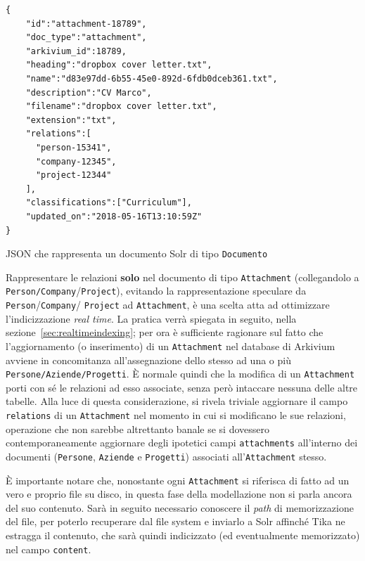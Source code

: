\vspace{0.5em}
\begin{listing}[H]
\begin{verbatim}
{
    "id":"attachment-18789",
    "doc_type":"attachment",
    "arkivium_id":18789,
    "heading":"dropbox cover letter.txt",
    "name":"d83e97dd-6b55-45e0-892d-6fdb0dceb361.txt",
    "description":"CV Marco",
    "filename":"dropbox cover letter.txt",
    "extension":"txt",
    "relations":[
      "person-15341",
      "company-12345",
      "project-12344"
    ],
    "classifications":["Curriculum"],
    "updated_on":"2018-05-16T13:10:59Z"
}
\end{verbatim}
\caption{JSON che rappresenta un documento Solr di tipo \texttt{Documento}}
\label{code:documentjson}
\end{listing}

\vspace{-0.5em}
Rappresentare le relazioni \textbf{solo} nel documento di tipo \texttt{Attachment} (collegandolo a \texttt{Person/Company}/\texttt{Project}), evitando la rappresentazione speculare da \texttt{Person}/\texttt{Company}/ \texttt{Project} ad \texttt{Attachment}, è una scelta atta ad ottimizzare l’indicizzazione \textit{real time}. La pratica verrà spiegata in seguito, nella sezione~\ref{sec:realtimeindexing}; per ora è sufficiente ragionare sul fatto che l’aggiornamento (o inserimento) di un \texttt{Attachment} nel database di Arkivium avviene in concomitanza all’assegnazione dello stesso ad una o più \texttt{Persone/Aziende/Progetti}. È normale quindi che la modifica di un \texttt{Attachment} porti con sé le relazioni ad esso associate, senza però intaccare nessuna delle altre tabelle. Alla luce di questa considerazione, si rivela triviale aggiornare il campo \texttt{relations} di un \texttt{Attachment} nel momento in cui si modificano le sue relazioni, operazione che non sarebbe altrettanto banale se si dovessero contemporaneamente aggiornare degli ipotetici campi \texttt{attachments} all’interno dei documenti (\texttt{Persone}, \texttt{Aziende} e \texttt{Progetti}) associati all’\texttt{Attachment} stesso.

\vspace{1em}

È importante notare che, nonostante ogni \texttt{Attachment} si riferisca di fatto ad un vero e proprio file su disco, in questa fase della modellazione non si parla ancora del suo contenuto. Sarà in seguito necessario conoscere il \textit{path} di memorizzazione del file, per poterlo recuperare dal file system e inviarlo a Solr affinché Tika ne estragga il contenuto, che sarà quindi indicizzato (ed eventualmente memorizzato) nel campo \texttt{content}.




